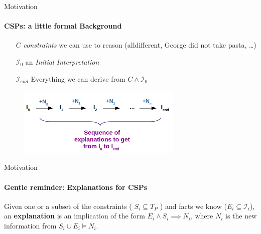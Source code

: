 \documentclass{beamer}
\newcommand\m[1]{\ensuremath{#1}\xspace}
\begin{document}
	\begin{frame}{Motivation}
		\framesubtitle{CSPs: a little formal Background}
		
		\begin{itemize}
			\item[$\m{C}$] \emph{constraints} we can use to reason (alldifferent, George did not take pasta, …)
			\item[$\mathcal{I}_0$] an \emph{Initial Interpretation}
			\item[$\mathcal{I}_{end}$] Everything we can derive from $ \m{C} \wedge \mathcal{I}_0$
		\end{itemize}
		\begin{figure}
			\includegraphics[width=0.7\textwidth]{sequence_explanation.png}
		\end{figure}
	\end{frame}
	
	
	\begin{frame}{Motivation}
		\framesubtitle{Gentle reminder: Explanations for CSPs}
		\begin{definition}
			Given one or a subset of the constraints ( $S_i \subseteq T_P$  ) and facts we know ($E_i\subseteq \mathcal{I}_i$), an \textbf{explanation} is an implication of the form $E_i \wedge S_i  \implies N_i $, where $N_i$ is the new information from $S_i \cup E_i \models N_i$. \cite{bogaerts2020step}
		\end{definition}
		
	\end{frame}
	
\end{document}
